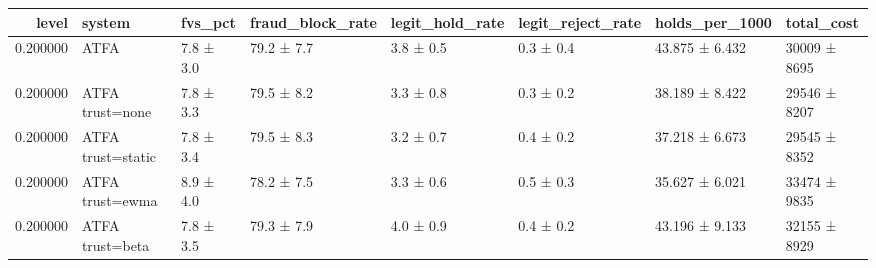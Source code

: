 \begin{tabular}{rlllllll}
\toprule
level & system & fvs\_pct & fraud\_block\_rate & legit\_hold\_rate & legit\_reject\_rate & holds\_per\_1000 & total\_cost \\
\midrule
0.200000 & ATFA & 7.8 ± 3.0 & 79.2 ± 7.7 & 3.8 ± 0.5 & 0.3 ± 0.4 & 43.875 ± 6.432 & 30009 ± 8695 \\
0.200000 & ATFA trust=none & 7.8 ± 3.3 & 79.5 ± 8.2 & 3.3 ± 0.8 & 0.3 ± 0.2 & 38.189 ± 8.422 & 29546 ± 8207 \\
0.200000 & ATFA trust=static & 7.8 ± 3.4 & 79.5 ± 8.3 & 3.2 ± 0.7 & 0.4 ± 0.2 & 37.218 ± 6.673 & 29545 ± 8352 \\
0.200000 & ATFA trust=ewma & 8.9 ± 4.0 & 78.2 ± 7.5 & 3.3 ± 0.6 & 0.5 ± 0.3 & 35.627 ± 6.021 & 33474 ± 9835 \\
0.200000 & ATFA trust=beta & 7.8 ± 3.5 & 79.3 ± 7.9 & 4.0 ± 0.9 & 0.4 ± 0.2 & 43.196 ± 9.133 & 32155 ± 8929 \\
\bottomrule
\end{tabular}
